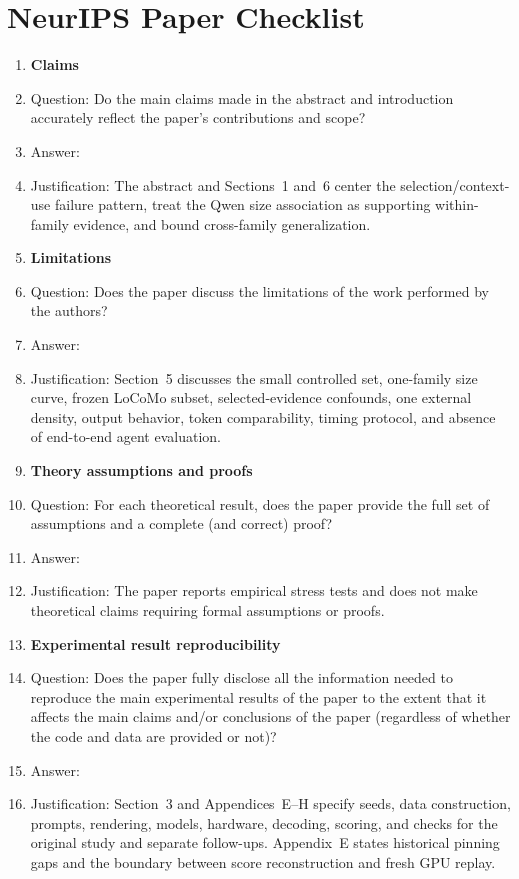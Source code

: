 \section*{NeurIPS Paper Checklist}

\begin{enumerate}

\item {\bf Claims}
    \item[] Question: Do the main claims made in the abstract and introduction accurately reflect the paper's contributions and scope?
    \item[] Answer: \answerYes{}
    \item[] Justification: The abstract and Sections~1 and~6 center the selection/context-use failure pattern, treat the Qwen size association as supporting within-family evidence, and bound cross-family generalization.

\item {\bf Limitations}
    \item[] Question: Does the paper discuss the limitations of the work performed by the authors?
    \item[] Answer: \answerYes{}
    \item[] Justification: Section~5 discusses the small controlled set, one-family size curve, frozen LoCoMo subset, selected-evidence confounds, one external density, output behavior, token comparability, timing protocol, and absence of end-to-end agent evaluation.

\item {\bf Theory assumptions and proofs}
    \item[] Question: For each theoretical result, does the paper provide the full set of assumptions and a complete (and correct) proof?
    \item[] Answer: \answerNA{}
    \item[] Justification: The paper reports empirical stress tests and does not make theoretical claims requiring formal assumptions or proofs.

    \item {\bf Experimental result reproducibility}
    \item[] Question: Does the paper fully disclose all the information needed to reproduce the main experimental results of the paper to the extent that it affects the main claims and/or conclusions of the paper (regardless of whether the code and data are provided or not)?
    \item[] Answer: \answerYes{}
    \item[] Justification: Section~3 and Appendices~E--H specify seeds, data construction, prompts, rendering, models, hardware, decoding, scoring, and checks for the original study and separate follow-ups. Appendix~E states historical pinning gaps and the boundary between score reconstruction and fresh GPU replay.


\end{enumerate}
